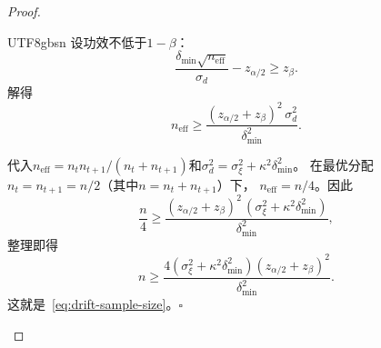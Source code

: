\documentclass[12pt,a4paper]{article}
\begin{document}
\begin{proof}
\begin{CJK}{UTF8}{gbsn}
设功效不低于$1-\beta$：
\[
\frac{\delta_{\min}\sqrt{n_{\text{eff}}}}{\sigma_d} - z_{\alpha/2} \ge z_{\beta}.
\]
解得
\[
n_{\text{eff}} \ge
\frac{(z_{\alpha/2} + z_{\beta})^2\,\sigma_d^2}{\delta_{\min}^2}.
\]

代入$n_{\text{eff}} = n_t n_{t+1}/(n_t + n_{t+1})$和$\sigma_d^2 = \sigma_\xi^2 + \kappa^2\delta_{\min}^2$。
在最优分配$n_t = n_{t+1} = n/2$（其中$n = n_t + n_{t+1}$）下，
$n_{\text{eff}} = n/4$。因此
\[
\frac{n}{4} \ge
\frac{(z_{\alpha/2} + z_{\beta})^2\,(\sigma_\xi^2 + \kappa^2\delta_{\min}^2)}{\delta_{\min}^2},
\]
整理即得
\[
n \ge
\frac{4(\sigma_\xi^2 + \kappa^2\delta_{\min}^2)
      (z_{\alpha/2} + z_\beta)^2}{\delta_{\min}^2}.
\]
这就是~\eqref{eq:drift-sample-size}。$\square$

\end{CJK}
\end{proof}
\end{document}
